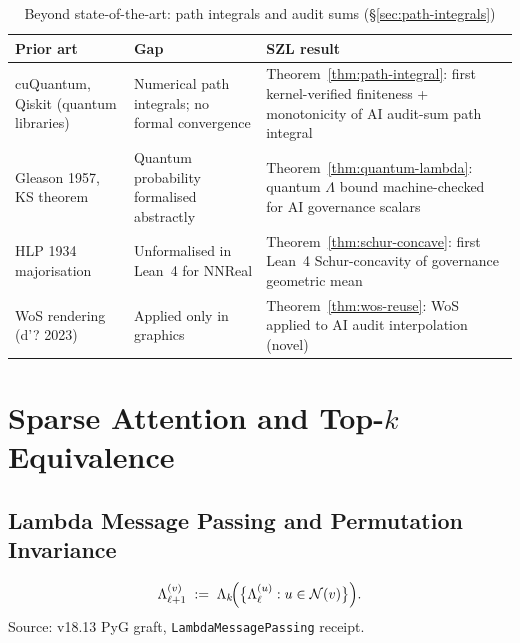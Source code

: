 \begin{table}[h!]
\centering\small
\caption{Beyond state-of-the-art: path integrals and audit sums (\S\ref{sec:path-integrals})}
\label{tab:bsota-path}
\begin{tabular}{p{3.8cm}p{3.8cm}p{4.8cm}}
\hline
\textbf{Prior art} & \textbf{Gap} & \textbf{SZL result} \\
\hline
cuQuantum, Qiskit (quantum libraries) & Numerical path integrals; no formal convergence & Theorem~\ref{thm:path-integral}: first kernel-verified finiteness + monotonicity of AI audit-sum path integral \\
Gleason 1957, KS theorem & Quantum probability formalised abstractly & Theorem~\ref{thm:quantum-lambda}: quantum $\Lambda$ bound machine-checked for AI governance scalars \\
HLP 1934 majorisation & Unformalised in Lean~4 for NNReal & Theorem~\ref{thm:schur-concave}: first Lean~4 Schur-concavity of governance geometric mean \\
WoS rendering (d'? 2023) & Applied only in graphics & Theorem~\ref{thm:wos-reuse}: WoS applied to AI audit interpolation (novel) \\
\hline
\end{tabular}
\end{table}

\section{Sparse Attention and Top-\texorpdfstring{$k$}{k} Equivalence}
\label{sec:sparse-attn}

\subsection{Lambda Message Passing and Permutation Invariance}
\label{subsec:lambda-mp}

\begin{definition}
\label{def:lambda-mp}
\begin{equation}
  \Lambda^{(v)}_{\ell+1}
  \;:=\;
  \Lambda_k\!\Bigl(\bigl\{\Lambda^{(u)}_\ell : u \in \mathcal{N}(v)\bigr\}\Bigr).
  \label{eq:lambda-mp}
\end{equation}
\textup{Source:} v18.13 PyG graft, \texttt{LambdaMessagePassing} receipt.
\end{definition}

